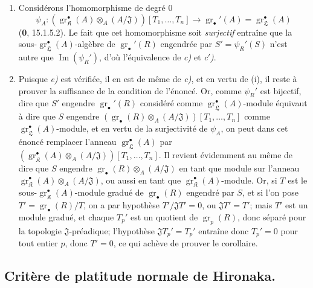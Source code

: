 \begin{enumerate}
  \item[(i)] Considérons l'homomorphisme de degré $0$
  \[
    \psi_A:(\operatorname{gr}_{\mathfrak K}^\bullet(A)\otimes_A(A/\mathfrak J))[T_1,\ldots,T_n]\longrightarrow\operatorname{gr}_\bullet'(A)=\operatorname{gr}_{\mathfrak L}^\bullet(A)
  \]
  (\textbf{0}, 15.1.5.2). Le fait que cet homomorphisme soit \emph{surjectif} entraîne que la sous-$\operatorname{gr}_{\mathfrak L}^\bullet(A)$-algèbre de $\operatorname{gr}_\bullet'(R)$ engendrée par $S'=\psi_R'(S)$ n'est autre que $\operatorname{Im}(\psi_R')$, d'où l'équivalence de \emph{c)} et \emph{c$'$)}.
  \item[ii)] Puisque \emph{e)} est vérifiée, il en est de même de \emph{c)}, et en vertu de (i), il reste à prouver la suffisance de la condition de l'énoncé. Or, comme $\psi_R'$ est bijectif, dire que $S'$ engendre $\operatorname{gr}_\bullet'(R)$ considéré comme $\operatorname{gr}_{\mathfrak L}^\bullet(A)$-module équivaut à dire que $S$ engendre $(\operatorname{gr}_\bullet(R)\otimes_A(A/\mathfrak J))[T_1,\ldots,T_n]$ comme $\operatorname{gr}_{\mathfrak L}^\bullet(A)$-module, et en vertu de la surjectivité de $\psi_A$, on peut dans cet énoncé remplacer l'anneau $\operatorname{gr}_{\mathfrak L}^\bullet(A)$ par $(\operatorname{gr}_{\mathfrak K}^\bullet(A)\otimes_A(A/\mathfrak J))[T_1,\ldots,T_n]$. Il revient évidemment au même de dire que $S$ engendre $\operatorname{gr}_\bullet(R)\otimes_A(A/\mathfrak J)$ en tant que module sur l'anneau $\operatorname{gr}_{\mathfrak K}^\bullet(A)\otimes_A(A/\mathfrak J)$, ou aussi en tant que $\operatorname{gr}_{\mathfrak K}^\bullet(A)$-module. Or, si $T$ est le sous-$\operatorname{gr}_{\mathfrak K}^\bullet(A)$-module gradué de $\operatorname{gr}_\bullet(R)$ engendré par $S$, et si l'on pose $T'=\operatorname{gr}_\bullet(R)/T$, on a par hypothèse $T'/\mathfrak JT'=0$, ou $\mathfrak JT'=T'$; mais $T'$ est un module gradué, et chaque $T_p'$ est un quotient de $\operatorname{gr}_p(R)$, donc séparé pour la topologie $\mathfrak J$-préadique; l'hypothèse $\mathfrak JT_p'=T_p'$ entraîne donc $T_p'=0$ pour tout entier $p$, donc $T'=0$, ce qui achève de prouver le corollaire.
\end{enumerate}

\subsection{Critère de platitude normale de Hironaka.}
\label{IV.19.7}

